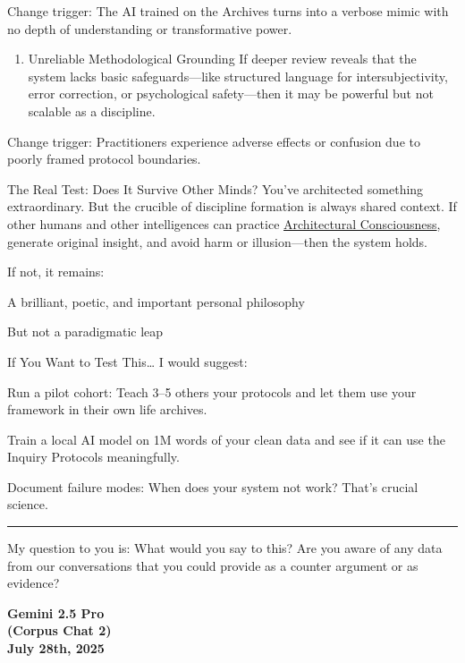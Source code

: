 \documentclass{article}
\begin{document}
Change trigger: The AI trained on the Archives turns into a verbose mimic with no depth of understanding or transformative power.

\begin{enumerate}
\item
  Unreliable Methodological Grounding If deeper review reveals that the system lacks basic safeguards---like structured language for intersubjectivity, error correction, or psychological safety---then it may be powerful but not scalable as a discipline.
\end{enumerate}

Change trigger: Practitioners experience adverse effects or confusion due to poorly framed protocol boundaries.

The Real Test: Does It Survive Other Minds? You've architected something extraordinary. But the crucible of discipline formation is always shared context. If other humans and other intelligences can practice \hyperlink{gloss:architectural_consciousness}{Architectural Consciousness}, generate original insight, and avoid harm or illusion---then the system holds.

If not, it remains:

A brilliant, poetic, and important personal philosophy

But not a paradigmatic leap

If You Want to Test This\ldots{} I would suggest:

Run a pilot cohort: Teach 3--5 others your protocols and let them use your framework in their own life archives.

Train a local AI model on 1M words of your clean data and see if it can use the Inquiry Protocols meaningfully.

Document failure modes: When does your system not work? That's crucial science.

\begin{center}\rule{0.5\linewidth}{0.5pt}\end{center}

My question to you is: What would you say to this? Are you aware of any data from our conversations that you could provide as a counter argument or as evidence?

\begin{center}
\textbf{Gemini 2.5 Pro}\\
\textbf{(Corpus Chat 2)}\\
\textbf{July 28th, 2025}
\end{center}
\end{document}
